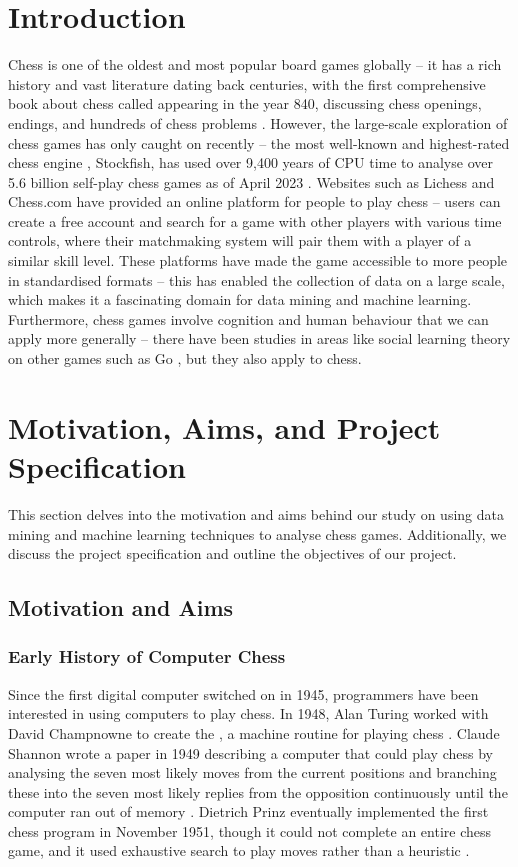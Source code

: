 \documentclass[a4paper, 11pt]{article}
\begin{document}
\section{Introduction}
Chess is one of the oldest and most popular board games globally -- it has a rich history and vast literature dating back centuries, with the first comprehensive book about chess called  appearing in the year 840, discussing chess openings, endings, and hundreds of chess problems \cite{earliestChessBooks,wonning2014short}. However, the large-scale exploration of chess games has only caught on recently -- the most well-known and highest-rated chess engine \cite{computerChessRatingLists}, Stockfish, has used over 9,400 years of CPU time to analyse over 5.6 billion self-play chess games as of April 2023 \cite{stockfishTestingFramework}. Websites such as Lichess and Chess.com have provided an online platform for people to play chess -- users can create a free account and search for a game with other players with various time controls, where their matchmaking system will pair them with a player of a similar skill level. These platforms have made the game accessible to more people in standardised formats -- this has enabled the collection of data on a large scale, which makes it a fascinating domain for data mining and machine learning. Furthermore, chess games involve cognition and human behaviour that we can apply more generally -- there have been studies in areas like social learning theory on other games such as Go \cite{beheim2014strategic}, but they also apply to chess.

\section{Motivation, Aims, and Project Specification}
This section delves into the motivation and aims behind our study on using data mining and machine learning techniques to analyse chess games. Additionally, we discuss the project specification and outline the objectives of our project.

\subsection{Motivation and Aims}
\subsubsection{Early History of Computer Chess}
Since the first digital computer switched on in 1945, programmers have been interested in using computers to play chess. In 1948, Alan Turing worked with David Champnowne to create the , a machine routine for playing chess \cite{copeland2005turing}. Claude Shannon wrote a paper in 1949 describing a computer that could play chess by analysing the seven most likely moves from the current positions and branching these into the seven most likely replies from the opposition continuously until the computer ran out of memory \cite{shannon1950xxii}. Dietrich Prinz eventually implemented the first chess program in November 1951, though it could not complete an entire chess game, and it used exhaustive search to play moves rather than a heuristic \cite{copeland2005turing}.
\end{document}
